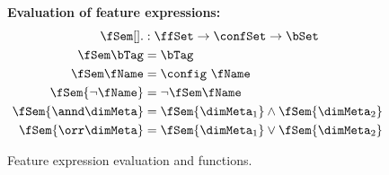 \begin{figure}
\textbf{Evaluation of feature expressions:}
\begin{alignat*}{1}
\fSem [] . &: \ffSet \to \confSet \to \bSet\\
\fSem \bTag &= \bTag\\
\fSem \fName &= \config \ \fName\\
\fSem {\neg \fName} &= \neg \fSem \fName\\
\fSem {\annd \dimMeta} &= \fSem {\dimMeta_1} \wedge \fSem {\dimMeta_2}\\
\fSem {\orr \dimMeta} &= \fSem {\dimMeta_1} \vee \fSem {\dimMeta_2}\\
\end{alignat*}

\begin{comment}

\medskip
\textbf{Functions over feature expressions:}
\begin{alignat*}{1}
\mathit{sat}, \mathit{taut} &: \ffSet \to \bSet \\
\sat \dimMeta = \t &\textit{ iff \ } \exists \config \in \confSet: \fSem \dimMeta = \t\\
\taut \dimMeta = \t &\textit{ iff \ } \forall \config \in \confSet: \fSem \dimMeta = \t
\end{alignat*}
\end{comment}

\caption{Feature expression evaluation and functions.}
\label{fig:fexp-eval}
\end{figure}

